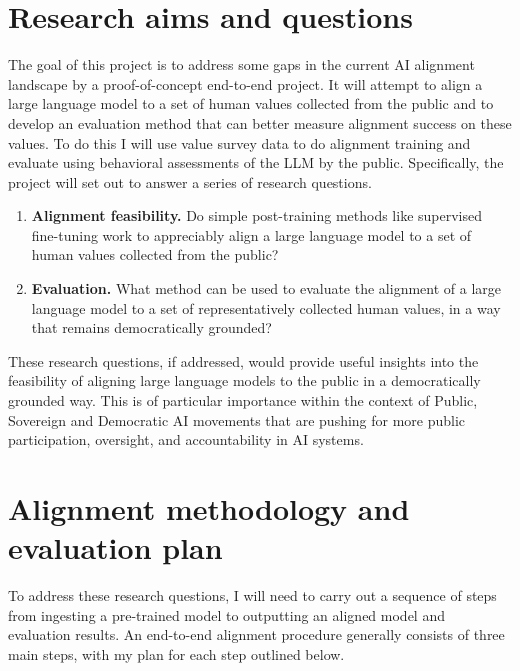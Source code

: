 \section{Research aims and questions}

The goal of this project is to address some gaps in the current AI alignment landscape by a proof-of-concept end-to-end project. It will attempt to align a large language model to a set of human values collected from the public and to develop an evaluation method that can better measure alignment success on these values. To do this I will use value survey data to do alignment training and evaluate using behavioral assessments of the LLM by the public. Specifically, the project will set out to answer a series of research questions.

\begin{enumerate}[label=\textbf{RQ\arabic*:}, ref=RQ\arabic*, leftmargin=*, itemsep=1em]
  \item \textbf{Alignment feasibility.} Do simple post-training methods like supervised fine-tuning work to appreciably align a large language model to a set of human values collected from the public? \label{rq1}

  \item \textbf{Evaluation.} What method can be used to evaluate the alignment of a large language model to a set of representatively collected human values, in a way that remains democratically grounded? \label{rq2}
\end{enumerate}

These research questions, if addressed, would provide useful insights into the feasibility of aligning large language models to the public in a democratically grounded way. This is of particular importance within the context of Public, Sovereign and Democratic AI \cite{daleSovereignAI20252025,nfeltSovereignRemediesAI2025,publicaiPublicAIWhite2024,ovadyaDemocraticAIPossible2025} movements that are pushing for more public participation, oversight, and accountability in AI systems.


\section{Alignment methodology and evaluation plan}

To address these research questions, I will need to carry out a sequence of steps from ingesting a pre-trained model to outputting an aligned model and evaluation results. An end-to-end alignment procedure generally consists of three main steps, with my plan for each step outlined below.


